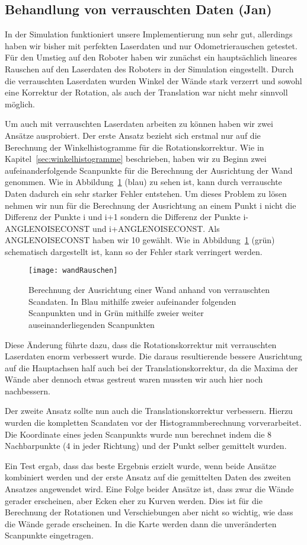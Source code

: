 \subsection{Behandlung von verrauschten Daten (Jan)}

In der Simulation funktioniert unsere Implementierung nun sehr gut, allerdings haben wir bisher mit perfekten Laserdaten und nur Odometrierauschen getestet. Für den Umstieg auf den Roboter haben wir zunächst ein hauptsächlich lineares Rauschen auf den Laserdaten des Roboters in der Simulation eingestellt. Durch die verrauschten Laserdaten wurden Winkel der Wände stark verzerrt und sowohl eine Korrektur der Rotation, als auch der Translation war nicht mehr sinnvoll möglich.


Um auch mit verrauschten Laserdaten arbeiten zu können haben wir zwei Ansätze ausprobiert. Der erste Ansatz bezieht sich erstmal nur auf die Berechnung der Winkelhistogramme für die Rotationskorrektur. Wie in Kapitel~\ref{sec:winkelhistogramme} beschrieben, haben wir zu Beginn zwei aufeinanderfolgende Scanpunkte für die Berechnung der Ausrichtung der Wand genommen. Wie in Abbildung~\ref{fig:wandRauschen} (blau) zu sehen ist, kann durch verrauschte Daten dadurch ein sehr starker Fehler entstehen. Um dieses Problem zu lösen nehmen wir nun für die Berechnung der Ausrichtung an einem Punkt i nicht die Differenz der Punkte i und i+1 sondern die Differenz der Punkte i-ANGLENOISECONST und i+ANGLENOISECONST. Als ANGLENOISECONST haben wir 10 gewählt. Wie in Abbildung~\ref{fig:wandRauschen} (grün) schematisch dargestellt ist, kann so der Fehler stark verringert werden.

\begin{figure}
	\centering
	\texttt{[image: wandRauschen]}
	\caption{Berechnung der Ausrichtung einer Wand anhand von verrauschten Scandaten. In Blau mithilfe zweier aufeinander folgenden Scanpunkten und in Grün mithilfe zweier weiter auseinanderliegenden Scanpunkten}
	\label{fig:wandRauschen}
\end{figure}

Diese Änderung führte dazu, dass die Rotationskorrektur mit verrauschten Laserdaten enorm verbessert wurde. Die daraus resultierende bessere Ausrichtung auf die Hauptachsen half auch bei der Translationskorrektur, da die Maxima der Wände aber dennoch etwas gestreut waren mussten wir auch hier noch nachbessern.

Der zweite Ansatz sollte nun auch die Translationskorrektur verbessern. Hierzu wurden die kompletten Scandaten vor der Histogrammberechnung vorverarbeitet. Die Koordinate eines jeden Scanpunkts wurde nun berechnet indem die 8 Nachbarpunkte (4 in jeder Richtung) und der Punkt selber gemittelt wurden.

Ein Test ergab, dass das beste Ergebnis erzielt wurde, wenn beide Ansätze kombiniert werden und der erste Ansatz auf die gemittelten Daten des zweiten Ansatzes angewendet wird. Eine Folge beider Ansätze ist, dass zwar die Wände gerader erscheinen, aber Ecken eher zu Kurven werden. Dies ist für die Berechnung der Rotationen und Verschiebungen aber nicht so wichtig, wie dass die Wände gerade erscheinen. In die Karte werden dann die unveränderten Scanpunkte eingetragen.